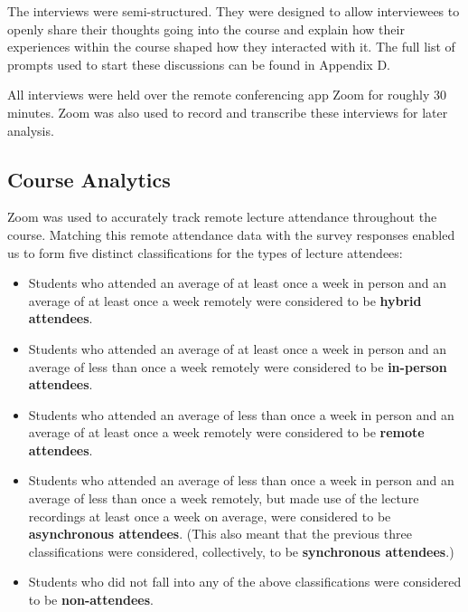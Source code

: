 The interviews were semi-structured. They were designed to allow interviewees to openly share their thoughts going into the course and explain how their experiences within the course shaped how they interacted with it. The full list of prompts used to start these discussions can be found in Appendix D.

All interviews were held over the remote conferencing app Zoom for roughly 30 minutes. Zoom was also used to record and transcribe these interviews for later analysis.

\subsection{Course Analytics}



Zoom was used to accurately track remote lecture attendance throughout the course. Matching this remote attendance data with the survey responses enabled us to form five distinct classifications for the types of lecture attendees:

\begin{itemize}
  \item Students who attended an average of at least once a week in person and an average of at least once a week remotely were considered to be \textbf{hybrid attendees}.
  \item Students who attended an average of at least once a week in person and an average of less than once a week remotely were considered to be \textbf{in-person attendees}.
  \item Students who attended an average of less than once a week in person and an average of at least once a week remotely were considered to be \textbf{remote attendees}.
  \item Students who attended an average of less than once a week in person and an average of less than once a week remotely, but made use of the lecture recordings at least once a week on average, were considered to be \textbf{asynchronous attendees}. (This also meant that the previous three classifications were considered, collectively, to be \textbf{synchronous attendees}.)
  \item Students who did not fall into any of the above classifications were considered to be \textbf{non-attendees}.
\end{itemize}

